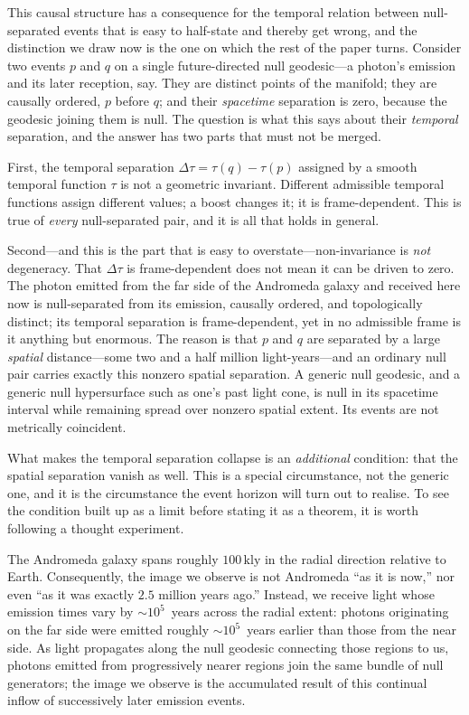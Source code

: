 \documentclass[11pt,a4paper]{article}
\theoremstyle{plain}
\theoremstyle{remark}
\begin{document}
This causal structure has a consequence for the temporal relation between null-separated events that is easy to half-state and thereby get wrong, and the distinction we draw now is the one on which the rest of the paper turns. Consider two events $p$ and $q$ on a single future-directed null geodesic---a photon's emission and its later reception, say. They are distinct points of the manifold; they are causally ordered, $p$ before $q$; and their \emph{spacetime} separation is zero, because the geodesic joining them is null. The question is what this says about their \emph{temporal} separation, and the answer has two parts that must not be merged.

First, the temporal separation $\Delta\tau=\tau(q)-\tau(p)$ assigned by a smooth temporal function $\tau$ is not a geometric invariant. Different admissible temporal functions assign different values; a boost changes it; it is frame-dependent. This is true of \emph{every} null-separated pair, and it is all that holds in general.

Second---and this is the part that is easy to overstate---non-invariance is \emph{not} degeneracy. That $\Delta\tau$ is frame-dependent does not mean it can be driven to zero. The photon emitted from the far side of the Andromeda galaxy and received here now is null-separated from its emission, causally ordered, and topologically distinct; its temporal separation is frame-dependent, yet in no admissible frame is it anything but enormous. The reason is that $p$ and $q$ are separated by a large \emph{spatial} distance---some two and a half million light-years---and an ordinary null pair carries exactly this nonzero spatial separation. A generic null geodesic, and a generic null hypersurface such as one's past light cone, is null in its spacetime interval while remaining spread over nonzero spatial extent. Its events are not metrically coincident.

What makes the temporal separation collapse is an \emph{additional} condition: that the spatial separation vanish as well. This is a special circumstance, not the generic one, and it is the circumstance the event horizon will turn out to realise. To see the condition built up as a limit before stating it as a theorem, it is worth following a thought experiment.

The Andromeda galaxy spans roughly $100\,\mathrm{kly}$ in the radial direction relative to Earth. Consequently, the image we observe is not Andromeda ``as it is now,'' nor even ``as it was exactly $2.5$ million years ago.'' Instead, we receive light whose emission times vary by $\sim10^5$~years across the radial extent: photons originating on the far side were emitted roughly $\sim10^5$~years earlier than those from the near side. As light propagates along the null geodesic connecting those regions to us, photons emitted from progressively nearer regions join the same bundle of null generators; the image we observe is the accumulated result of this continual inflow of successively later emission events.
\end{document}
